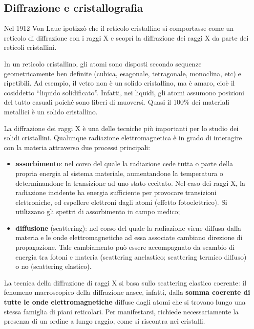 \subsection{Diffrazione e cristallografia}

Nel 1912 Von Laue ipotizzò che il reticolo cristallino si comportasse come un reticolo di diffrazione con i raggi X e scoprì la diffrazione dei raggi X da parte dei reticoli cristallini.

In un reticolo cristallino, gli atomi sono disposti secondo sequenze geometricamente ben definite (cubica, esagonale, tetragonale, monoclina, etc) e ripetibili. Ad esempio, il vetro non è un solido cristallino, ma è amaro, cioè il cosiddetto “liquido solidificato”. Infatti, nei liquidi, gli atomi assumono posizioni del tutto casuali poiché sono liberi di muoversi. Quasi il 100\% dei materiali metallici è un solido cristallino.

La diffrazione dei raggi X è una delle tecniche più importanti per lo studio dei solidi cristallini. Qualunque radiazione elettromagnetica è in grado di interagire con la materia attraverso due processi principali:
\begin{itemize}
    \item \textbf{assorbimento}: nel corso del quale la radiazione cede tutta o parte della propria energia al
sistema materiale, aumentandone la temperatura o determinandone la transizione ad uno stato eccitato. Nel caso dei raggi X, la radiazione incidente ha energia sufficiente per provocare transizioni elettroniche, ed espellere elettroni dagli atomi (effetto fotoelettrico). Si utilizzano gli spettri di assorbimento in campo medico;
\item\textbf{diffusione} (scattering): nel corso del quale la radiazione viene diffusa dalla materia e le onde elettromagnetiche ad essa associate cambiano direzione di propagazione. Tale cambiamento può essere accompagnato da scambio di energia tra fotoni e materia (scattering anelastico; scattering termico diffuso) o no (scattering elastico).
\end{itemize}

La tecnica della diffrazione di raggi X si basa sullo scattering elastico coerente: il fenomeno macroscopico della diffrazione nasce, infatti, dalla \textbf{somma coerente di tutte le onde elettromagnetiche} diffuse dagli atomi che si trovano lungo una stessa famiglia di piani reticolari. Per manifestarsi, richiede necessariamente la presenza di un ordine a lungo raggio, come si riscontra nei cristalli.

